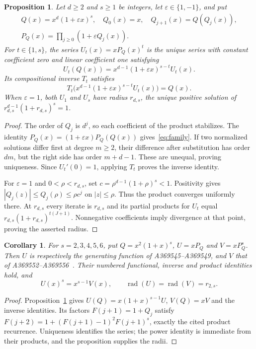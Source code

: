 \documentclass[11pt]{article}
\newtheorem{proposition}[theorem]{Proposition}
\newtheorem{corollary}[theorem]{Corollary}
\begin{document}
\begin{proposition}\label{prop:family}
Let $d\ge2$ and $s\ge1$ be integers, let $\varepsilon\in\{1,-1\}$,
and put
\[
 \begin{gathered}
 Q(x)=x^d(1+\varepsilon x)^s,\quad Q_0(x)=x,\quad Q_{j+1}(x)=Q(Q_j(x)),\\
 P_Q(x)=\prod_{j\ge0}(1+\varepsilon Q_j(x)).
 \end{gathered}
\]
For $t\in\{1,s\}$, the series $U_t(x)=xP_Q(x)^t$ is the unique
series with constant coefficient zero and linear coefficient one satisfying
\begin{equation}\label{eq:family}
 U_t(Q(x))=x^{d-1}(1+\varepsilon x)^{s-t}U_t(x).
\end{equation}
Its compositional inverse $T_t$ satisfies
\[
 T_t\bigl(x^{d-1}(1+\varepsilon x)^{s-t}U_t(x)\bigr)=Q(x).
\]
When $\varepsilon=1$, both $U_1$ and $U_s$ have radius $r_{d,s}$,
the unique positive solution of $r_{d,s}^{d-1}(1+r_{d,s})^s=1$.
\end{proposition}
\begin{proof}
The order of $Q_j$ is $d^j$, so each coefficient of the product
stabilizes. The identity $P_Q(x)=(1+\varepsilon x)P_Q(Q(x))$
gives~\eqref{eq:family}. If two normalized solutions differ first at
degree $m\ge2$, their difference after substitution has order $dm$,
but the right side has order $m+d-1$. These are unequal, proving
uniqueness. Since $U_t'(0)=1$, applying $T_t$ proves the inverse identity.

For $\varepsilon=1$ and $0<\rho<r_{d,s}$, set
$c=\rho^{d-1}(1+\rho)^s<1$. Positivity gives
$|Q_j(z)|\le Q_j(\rho)\le\rho c^j$ on $|z|\le\rho$.
Thus the product converges uniformly there. At $r_{d,s}$ every
iterate is $r_{d,s}$ and its partial products for $U_t$ equal
$r_{d,s}(1+r_{d,s})^{t(J+1)}$. Nonnegative coefficients imply
divergence at that point, proving the asserted radius.
\end{proof}

\begin{corollary}\label{cor:positive}
For $s=2,3,4,5,6$, put $Q=x^2(1+x)^s$, $U=xP_Q$ and $V=xP_Q^s$.
Then $U$ is respectively the generating function of A369545--A369549,
and $V$ that of A369552--A369556~\cite{hanna-family}. Their numbered
functional, inverse and product identities hold, and
\[
 U(x)^s=x^{s-1}V(x),\qquad
 \operatorname{rad}(U)=\operatorname{rad}(V)=r_{2,s}.
\]
\end{corollary}
\begin{proof}
Proposition~\ref{prop:family} gives $U(Q)=x(1+x)^{s-1}U$,
$V(Q)=xV$ and the inverse identities. Its factors $F(j+1)=1+Q_j$
satisfy $F(j+2)=1+(F(j+1)-1)^2F(j+1)^s$, exactly the cited
product recurrence. Uniqueness identifies the series; the power identity
is immediate from their products, and the proposition supplies the radii.
\end{proof}
\end{document}

